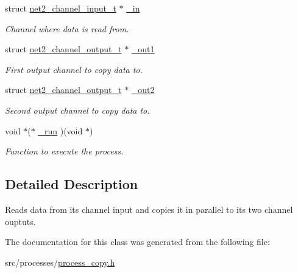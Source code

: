 \begin{DoxyCompactItemize}
\item 
\hypertarget{structprocess__copy__int__t_a81c5105a6213d656c8a927e1438be22b}{}struct \hyperlink{structnet2__channel__input__t}{net2\+\_\+channel\+\_\+input\+\_\+t} $\ast$ \hyperlink{structprocess__copy__int__t_a81c5105a6213d656c8a927e1438be22b}{\+\_\+in}\label{structprocess__copy__int__t_a81c5105a6213d656c8a927e1438be22b}

\begin{DoxyCompactList}\small\item\em Channel where data is read from. \end{DoxyCompactList}\item 
\hypertarget{structprocess__copy__int__t_a291f78ff424b5a6275d71a5c75397e74}{}struct \hyperlink{structnet2__channel__output__t}{net2\+\_\+channel\+\_\+output\+\_\+t} $\ast$ \hyperlink{structprocess__copy__int__t_a291f78ff424b5a6275d71a5c75397e74}{\+\_\+out1}\label{structprocess__copy__int__t_a291f78ff424b5a6275d71a5c75397e74}

\begin{DoxyCompactList}\small\item\em First output channel to copy data to. \end{DoxyCompactList}\item 
\hypertarget{structprocess__copy__int__t_a8f36052501a43e82f2924efa2d04b844}{}struct \hyperlink{structnet2__channel__output__t}{net2\+\_\+channel\+\_\+output\+\_\+t} $\ast$ \hyperlink{structprocess__copy__int__t_a8f36052501a43e82f2924efa2d04b844}{\+\_\+out2}\label{structprocess__copy__int__t_a8f36052501a43e82f2924efa2d04b844}

\begin{DoxyCompactList}\small\item\em Second output channel to copy data to. \end{DoxyCompactList}\item 
\hypertarget{structprocess__copy__int__t_acce8e0d60ef5de3ba55c517c2837f26b}{}void $\ast$($\ast$ \hyperlink{structprocess__copy__int__t_acce8e0d60ef5de3ba55c517c2837f26b}{\+\_\+run} )(void $\ast$)\label{structprocess__copy__int__t_acce8e0d60ef5de3ba55c517c2837f26b}

\begin{DoxyCompactList}\small\item\em Function to execute the process. \end{DoxyCompactList}\end{DoxyCompactItemize}


\subsection{Detailed Description}
Reads data from its channel input and copies it in parallel to its two channel ouptuts. 

The documentation for this class was generated from the following file\+:\begin{DoxyCompactItemize}
\item 
src/processes/\hyperlink{process__copy_8h}{process\+\_\+copy.\+h}\end{DoxyCompactItemize}
